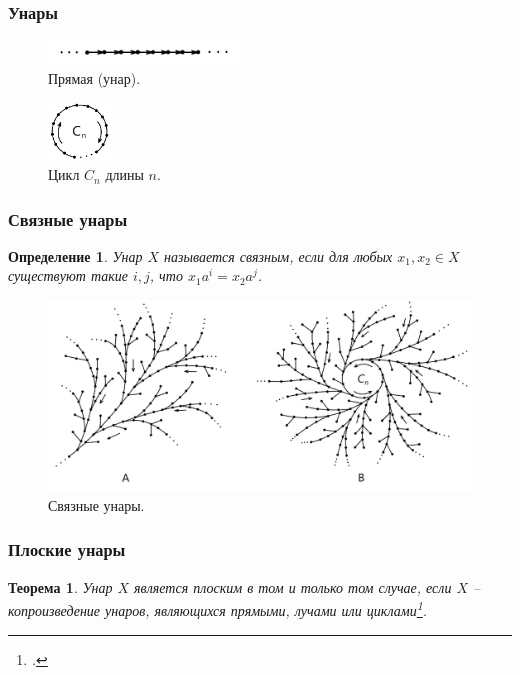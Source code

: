 \documentclass[11pt, notheorems]{beamer}
\newtheorem{definition}{Определение}
\newtheorem{theorem}{Теорема}
\begin{document}
\begin{frame}
	\frametitle{Унары}

	\begin{figure}
		\center
		\includegraphics[width=0.45\textwidth]{line}
		\caption{Прямая (унар).}
	\end{figure}

	\begin{figure}
		\center
		\includegraphics[width=0.15\textwidth]{cycle}
		\caption{Цикл $C_n$ длины $n$.}
	\end{figure}
\end{frame}

\begin{frame}
	\frametitle{Связные унары}

	\begin{definition}
		Унар $X$ называется \textit{связным}, если для любых $x_1, x_2 \in X$ существуют такие $i, j$, что $x_1 a^i = x_2 a^j$.
	\end{definition}

	\begin{figure}
		\center
		\includegraphics[width=1.0\textwidth]{connected_unars}
		\caption{Связные унары.}
	\end{figure}
\end{frame}

\begin{frame}
	\frametitle{Плоские унары}

	\begin{theorem}
		Унар $X$ является плоским в том и только том случае, если $X$ -- копроизведение унаров, являющихся прямыми, лучами или циклами\footcite[теорема]{flat_unars}.
	\end{theorem}
\end{frame}
\end{document}
